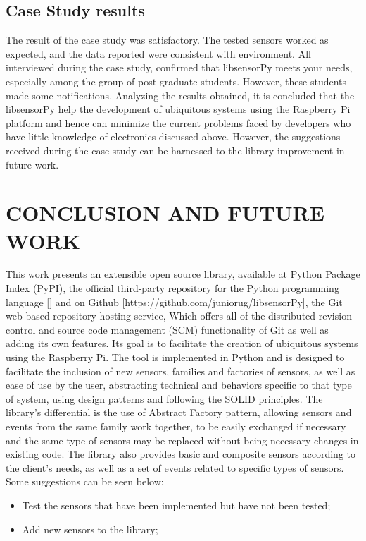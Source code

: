 \documentclass{acm_proc_article-sp}
\begin{document}
\subsection{Case Study results}
The result of the case study was satisfactory. The tested sensors worked as expected, and the data reported were consistent with environment. All interviewed during the case study, confirmed that libsensorPy meets your needs, especially among the group of post graduate students. However, these students made some notifications.
\newline
\newline
Analyzing the results obtained, it is concluded that the libsensorPy help the development of ubiquitous systems using the Raspberry Pi platform and hence can minimize the current problems faced by developers who have little knowledge of electronics discussed above. However, the suggestions received during the case study can be harnessed to the library improvement in future work.
\newline
\newline
\section{CONCLUSION AND FUTURE WORK}
This work presents an extensible open source library, available at Python Package Index (PyPI), the official third-party repository for the Python programming language [] %
and on Github [https://github.com/juniorug/libsensorPy], the Git web-based repository hosting service, Which offers all of the distributed revision control and source code management (SCM) functionality of Git as well as adding its own features.
\newline
\newline
Its goal is to facilitate the creation of ubiquitous systems using the Raspberry Pi. The tool is implemented in Python and is designed to facilitate the inclusion of new sensors, families and factories of sensors, as well as ease of use by the user, abstracting technical and behaviors specific to that type of system, using design patterns and following the SOLID principles.
\newline
\newline
The library's differential is the use of Abstract Factory pattern, allowing sensors and events from the same family work together, to be easily exchanged if necessary and the same type of sensors may be replaced without being necessary changes in existing code. The library also provides basic and composite  sensors according to the client's needs, as well as a set of events related to specific types of sensors.
\newline
\newline
Some suggestions can be seen below:
\begin{itemize}
\item Test the sensors that have been implemented but have not been tested;
\item Add new sensors to the library;

\end{itemize}
\end{document}
